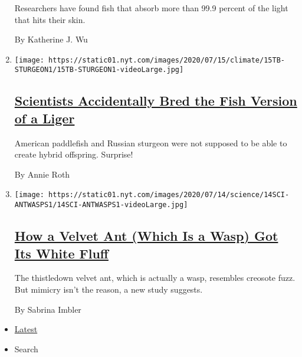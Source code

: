 \begin{enumerate}
  Researchers have found fish that absorb more than 99.9 percent of the
  light that hits their skin.

  By Katherine J. Wu
\item
  \texttt{[image: https://static01.nyt.com/images/2020/07/15/climate/15TB-STURGEON1/15TB-STURGEON1-videoLarge.jpg]}

  \hypertarget{scientists-accidentally-bred-the-fish-version-of-a-liger}{%
  \subsection{\texorpdfstring{\href{/2020/07/15/science/hybrid-sturgeon-paddlefish.html}{Scientists
  Accidentally Bred the Fish Version of a
  Liger}}{Scientists Accidentally Bred the Fish Version of a Liger}}\label{scientists-accidentally-bred-the-fish-version-of-a-liger}}

  American paddlefish and Russian sturgeon were not supposed to be able
  to create hybrid offspring. Surprise!

  By Annie Roth
\item
  \texttt{[image: https://static01.nyt.com/images/2020/07/14/science/14SCI-ANTWASPS1/14SCI-ANTWASPS1-videoLarge.jpg]}

  \hypertarget{how-a-velvet-ant-which-is-a-wasp-got-its-white-fluff}{%
  \subsection{\texorpdfstring{\href{/2020/07/14/science/white-fluffy-ant-wasp.html}{How
  a Velvet Ant (Which Is a Wasp) Got Its White
  Fluff}}{How a Velvet Ant (Which Is a Wasp) Got Its White Fluff}}\label{how-a-velvet-ant-which-is-a-wasp-got-its-white-fluff}}

  The thistledown velvet ant, which is actually a wasp, resembles
  creosote fuzz. But mimicry isn't the reason, a new study suggests.

  By Sabrina Imbler
\end{enumerate}

\begin{itemize}
\tightlist
\item
  \protect\hyperlink{stream-panel}{Latest}
\item
  Search
\end{itemize}

